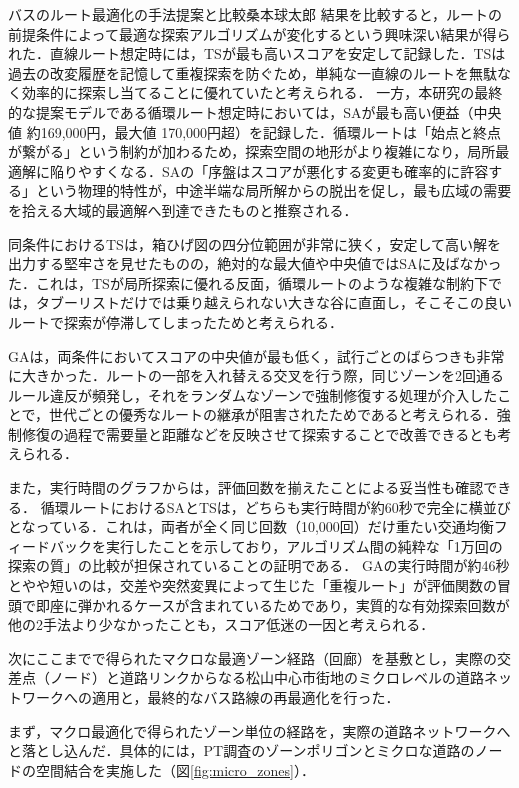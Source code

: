 \begin{column}{バスのルート最適化の手法提案と比較}{桑本球太郎}
結果を比較すると，ルートの前提条件によって最適な探索アルゴリズムが変化するという興味深い結果が得られた．直線ルート想定時には，TSが最も高いスコアを安定して記録した．TSは過去の改変履歴を記憶して重複探索を防ぐため，単純な一直線のルートを無駄なく効率的に探索し当てることに優れていたと考えられる．
一方，本研究の最終的な提案モデルである循環ルート想定時においては，SAが最も高い便益（中央値 約169,000円，最大値 170,000円超）を記録した．循環ルートは「始点と終点が繋がる」という制約が加わるため，探索空間の地形がより複雑になり，局所最適解に陥りやすくなる．SAの「序盤はスコアが悪化する変更も確率的に許容する」という物理的特性が，中途半端な局所解からの脱出を促し，最も広域の需要を拾える大域的最適解へ到達できたものと推察される．

同条件におけるTSは，箱ひげ図の四分位範囲が非常に狭く，安定して高い解を出力する堅牢さを見せたものの，絶対的な最大値や中央値ではSAに及ばなかった．これは，TSが局所探索に優れる反面，循環ルートのような複雑な制約下では，タブーリストだけでは乗り越えられない大きな谷に直面し，そこそこの良いルートで探索が停滞してしまったためと考えられる．

GAは，両条件においてスコアの中央値が最も低く，試行ごとのばらつきも非常に大きかった．ルートの一部を入れ替える交叉を行う際，同じゾーンを2回通るルール違反が頻発し，それをランダムなゾーンで強制修復する処理が介入したことで，世代ごとの優秀なルートの継承が阻害されたためであると考えられる．強制修復の過程で需要量と距離などを反映させて探索することで改善できるとも考えられる．

また，実行時間のグラフからは，評価回数を揃えたことによる妥当性も確認できる．
循環ルートにおけるSAとTSは，どちらも実行時間が約60秒で完全に横並びとなっている．これは，両者が全く同じ回数（10,000回）だけ重たい交通均衡フィードバックを実行したことを示しており，アルゴリズム間の純粋な「1万回の探索の質」の比較が担保されていることの証明である．
GAの実行時間が約46秒とやや短いのは，交差や突然変異によって生じた「重複ルート」が評価関数の冒頭で即座に弾かれるケースが含まれているためであり，実質的な有効探索回数が他の2手法より少なかったことも，スコア低迷の一因と考えられる．

次にここまでで得られたマクロな最適ゾーン経路（回廊）を基敷とし，実際の交差点（ノード）と道路リンクからなる松山中心市街地のミクロレベルの道路ネットワークへの適用と，最終的なバス路線の再最適化を行った．

まず，マクロ最適化で得られたゾーン単位の経路を，実際の道路ネットワークへと落とし込んだ．具体的には，PT調査のゾーンポリゴンとミクロな道路のノードの空間結合を実施した（図\ref{fig:micro_zones}）．


\end{column}
